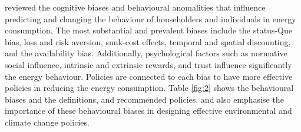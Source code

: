 \documentclass[preprint,12pt,3p]{elsarticle}
\begin{document}
 
\citeauthor{frederiks2015} \citeyearpar{frederiks2015} reviewed the cognitive biases and behavioural anomalities that influence predicting and changing the behaviour of householders and individuals in energy consumption. The most substantial and prevalent biases include the status-Que bias, loss and risk aversion, sunk-cost effects, temporal and spatial discounting, and the availability bias. Additionally, psychological factors such as normative social influence, intrinsic and extrinsic rewards, and trust influence significantly the energy behaviour. Policies are connected to each bias to have more effective policies in reducing the energy consumption. Table \ref{fig:2} shows the behavioural biases and the definitions, and recommended policies. \citeauthor{gowdy2008} \citeyearpar{gowdy2008} and \citeauthor{venkatachalam2008} \citeyearpar{venkatachalam2008} also emphasise the importance of these behavioural biases in designing effective environmental and climate change policies. 
 
\end{document}
